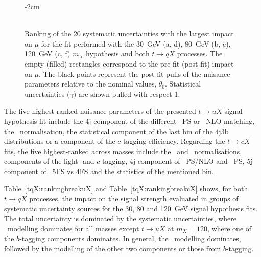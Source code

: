 \begin{figure}[htb]
    \RawFloats
    \addtolength{\leftskip} {-2cm} %
    \addtolength{\rightskip}{-2cm}
    \centering
    \\
    \\
    \caption{Ranking of the 20 systematic uncertainties with the largest impact on $\mu$ for the fit performed with the 30~GeV (a, d), 80~GeV (b, e), 120~GeV (c, f) $m_X$ hypothesis and both $t\to qX$ processes. The empty (filled) rectangles correspond  to the pre-fit (post-fit) impact on $\mu$. The black points represent the post-fit pulls of the nuisance parameters relative to the nominal values, $\theta_0$. Statistical uncertainties ($\gamma$) are shown pulled with respect 1.
    }
    \label{tqX:ranking3080120}
\end{figure}

The five highest-ranked nuisance parameters of the presented $t\to uX$ signal hypothesis fit include the 4j component of the different \ttjets\ PS or \ttl\ NLO matching, the \ttc\ normalisation, the statistical component of the last bin of the 4j3b distributions or a component of the $c$-tagging efficiency. Regarding the $t\to cX$ fits, the five highest-ranked across masses include the \ttb\ and \ttc\ normalisations, components of the light- and $c$-tagging, 4j component of \ttb\ PS/NLO and \ttl\ PS, 5j component of \ttb\ 5FS vs 4FS and the statistics of the mentioned bin.

Table~\ref{tqX:rankingbreakuX} and Table~\ref{tqX:rankingbreakcX} shows, for both $t\to qX$ processes, the impact on the signal strength evaluated in groups of systematic uncertainty sources for the 30, 80 and 120~GeV signal hypothesis fits. The total uncertainty is dominated by the systematic uncertainties, where \ttb\ modelling dominates for all masses except $t\to uX$ at $m_X=120$, where one of the $b$-tagging components dominates. In general, the \ttb\ modelling dominates, followed by the modelling of the other two components or those from $b$-tagging.

